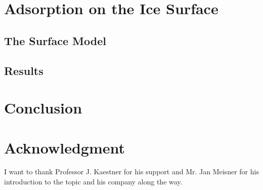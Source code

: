 \documentclass[8.5pt,twoside,twocolumn]{article}
\theoremstyle{standard}
\begin{document}
\newpage

\section{Adsorption on the Ice Surface}
\label{Sec:Ads}

\subsection{The Surface Model}
\label{Sec:Ads:Model}

\subsection{Results}
\label{Sec:Ads:Results}

\section{Conclusion}
\label{Sec:Con}

\section*{Acknowledgment}
I want to thank Professor J. Kaestner for his support and Mr. Jan Meisner for
his introduction to the topic and his company along the way.


% 


\end{document}

